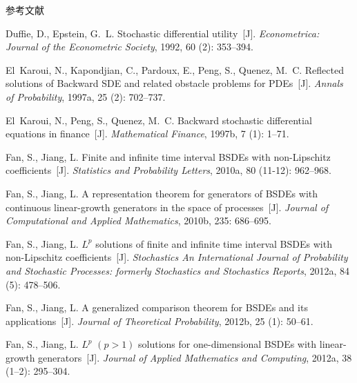 \documentclass[xcolor=svgnames,serif,table,10pt]{beamer}
\begin{document}
\begin{frame}[allowframebreaks]{参考文献}
\begin{thebibliography}{57}
Duffie, D., Epstein, G.~L.
\newblock Stochastic differential utility~[J].
\newblock \emph{Econometrica: Journal of the Econometric Society}, 1992,
  60 (2): 353--394.

El~Karoui, N., Kapondjian, C., Pardoux, E., Peng, S., Quenez, M.~C.
\newblock Reflected solutions of {B}ackward {SDE} and related obstacle problems
  for {PDE}s~[J].
\newblock \emph{Annals of Probability}, 1997a, 25
  (2): 702--737.

El~Karoui, N., Peng, S., Quenez, M.~C.
\newblock Backward stochastic differential equations in finance~[J].
\newblock \emph{Mathematical Finance}, 1997b, 7
  (1): 1--71.


Fan, S., Jiang, L.
\newblock Finite and infinite time interval {BSDE}s with non-{L}ipschitz
  coefficients~[J].
\newblock \emph{Statistics and Probability Letters}, 2010a, 80
  (11-12): 962--968.

Fan, S., Jiang, L.
\newblock A representation theorem for generators of {BSDE}s with continuous
  linear-growth generators in the space of processes~[J].
\newblock \emph{Journal of Computational and Applied Mathematics}, 2010b,
  235: 686--695.

Fan, S., Jiang, L.
\newblock ${L}^p$ solutions of finite and infinite time interval {BSDE}s with
  non-{L}ipschitz coefficients~[J].
\newblock \emph{Stochastics An International Journal of Probability and
  Stochastic Processes: formerly Stochastics and Stochastics Reports},
  2012a, 84 (5): 478--506.

Fan, S., Jiang, L.
\newblock A generalized comparison theorem for {BSDE}s and its
  applications~[J].
\newblock \emph{Journal of Theoretical Probability}, 2012b,
  25 (1): 50--61.

Fan, S., Jiang, L.
\newblock ${L}^p$ $(p>1)$ solutions for one-dimensional {BSDE}s with
  linear-growth generators~[J].
\newblock \emph{Journal of Applied Mathematics and Computing}, 2012a,
  38 (1--2): 295--304.


\end{thebibliography}
\end{frame}
\end{document}
